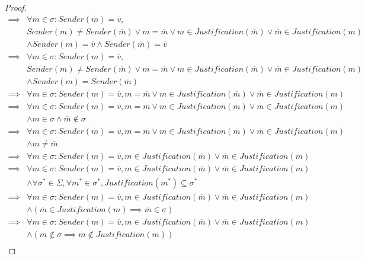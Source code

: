 \begin{proof}
\begin{align}
\implies&\forall m \in \sigma: Sender(m) = \overline{v}, \\
        &Sender(m) \neq Sender(\overline{m}) \lor m = \overline{m} \lor m \in Justification(\overline{m}) \lor \overline{m} \in Justification(m) \\
        &\land Sender(m) = \overline{v} \land Sender(\overline{m}) = \overline{v} \\
\implies&\forall m \in \sigma: Sender(m) = \overline{v}, \\
        &Sender(m) \neq Sender(\overline{m}) \lor m = \overline{m} \lor m \in Justification(\overline{m}) \lor \overline{m} \in Justification(m) \\
        &\land Sender(m) = Sender(\overline{m}) \\
\implies&\forall m \in \sigma: Sender(m) = \overline{v}, m = \overline{m} \lor m \in Justification(\overline{m}) \lor \overline{m} \in Justification(m) \\
\implies&\forall m \in \sigma: Sender(m) = \overline{v}, m = \overline{m} \lor m \in Justification(\overline{m}) \lor \overline{m} \in Justification(m) \\
        &\land m \in \sigma \land \overline{m} \notin \sigma \\
\implies&\forall m \in \sigma: Sender(m) = \overline{v}, m = \overline{m} \lor m \in Justification(\overline{m}) \lor \overline{m} \in Justification(m) \\
        &\land m \neq \overline{m} \\
\implies&\forall m \in \sigma: Sender(m) = \overline{v}, m \in Justification(\overline{m}) \lor \overline{m} \in Justification(m) \\
\implies&\forall m \in \sigma: Sender(m) = \overline{v}, m \in Justification(\overline{m}) \lor \overline{m} \in Justification(m) \\
        &\land \forall \sigma^* \in \Sigma, \forall m^* \in \sigma^*, Justification(m^*) \subseteq \sigma^* \\
\implies&\forall m \in \sigma: Sender(m) = \overline{v}, m \in Justification(\overline{m}) \lor \overline{m} \in Justification(m) \\
        &\land (\overline{m} \in Justification(m) \implies \overline{m} \in \sigma) \\
\implies&\forall m \in \sigma: Sender(m) = \overline{v}, m \in Justification(\overline{m}) \lor \overline{m} \in Justification(m) \\
        &\land (\overline{m} \notin \sigma \implies \overline{m} \notin Justification(m)) \\

\end{align}
\end{proof}
